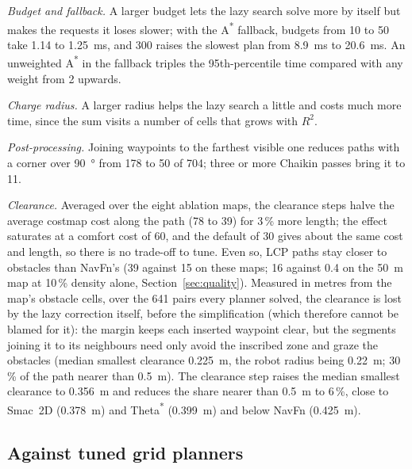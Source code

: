\documentclass[conference]{IEEEtran}
\newcommand{\lcp}{LCP}
\begin{document}
\emph{Budget and fallback.} A larger budget lets the lazy search solve more by
itself but makes the requests it loses slower; with the
A\textsuperscript{*} fallback, budgets from 10 to 50 take 1.14 to \SI{1.25}{ms},
and 300 raises
the slowest plan from \SI{8.9}{ms} to \SI{20.6}{ms}. An unweighted
A\textsuperscript{*} in the fallback triples the 95th-percentile time compared
with any weight from 2 upwards.

\emph{Charge radius.} A larger radius helps the lazy search a little and costs
much more time, since the sum visits a number of cells that grows with $R^2$.

\emph{Post-processing.} Joining waypoints to the farthest visible one reduces
paths with a corner over \SI{90}{\degree} from 178 to 50 of 704; three or more
Chaikin passes bring it to 11.

\emph{Clearance.} Averaged over the eight ablation maps, the clearance steps
halve the average costmap cost along the path (78 to 39) for 3\,\% more length;
the effect saturates at a comfort cost of 60, and the default of 30 gives about the same
cost and length, so there is no trade-off to tune. Even so, \lcp{} paths stay closer
to obstacles than NavFn's (39 against 15 on these maps; 16 against 0.4 on the
\SI{50}{m} map at 10\,\% density alone, Section~\ref{sec:quality}).
Measured in metres from the map's obstacle cells, over the 641 pairs every
planner solved, the clearance is lost by the lazy correction itself, before the
simplification (which therefore cannot be blamed for it): the margin keeps each
inserted waypoint clear, but the segments joining it to its neighbours need only
avoid the inscribed zone and graze the obstacles (median smallest clearance
\SI{0.225}{m}, the robot radius being \SI{0.22}{m}; 30\,\% of the path nearer
than \SI{0.5}{m}). The clearance step raises the median smallest clearance to
\SI{0.356}{m} and reduces the share nearer than \SI{0.5}{m} to 6\,\%, close to
Smac~2D (\SI{0.378}{m}) and Theta\textsuperscript{*} (\SI{0.399}{m}) and below
NavFn (\SI{0.425}{m}).

\subsection{Against tuned grid planners}
\label{sec:tuned}
\end{document}
